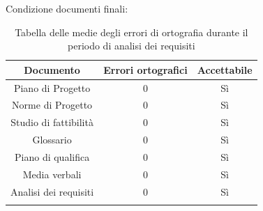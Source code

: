 Condizione documenti finali:
\begin{center}
	\begin{longtable}{|c|c|c|}
	\hline
	\rowcolor{lighter-grayer}
	\textbf{Documento} & \textbf{Errori ortografici} & \textbf{Accettabile} \\
	\hline
	\endfirsthead

	\hline
	Piano di Progetto & 0 & Sì \\
	\hline
	\hline
	Norme di Progetto &  0 & Sì \\
	\hline
	\hline
	Studio di fattibilità & 0 & Sì \\
	\hline
	\hline
	Glossario & 0 & Sì \\
	\hline
	\hline
	Piano di qualifica & 0 & Sì \\
	\hline
	\hline
	Media verbali & 0 & Sì \\
	\hline
	\hline
	Analisi dei requisiti & 0 & Sì \\
	\hline
	\rowcolor{white}
	\caption{Tabella delle medie degli errori di ortografia durante il periodo di analisi dei requisiti}
	\end{longtable}
\end{center}
